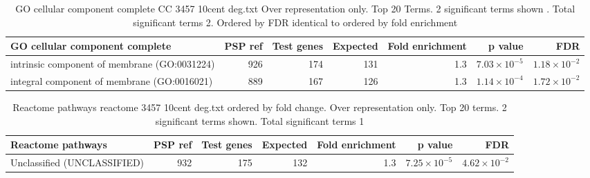 \begin{table}[ht]
\centering
\begin{adjustbox}{width=\textwidth}
\begin{tabular}{lrrrrrr}
  \hline
GO cellular component complete & PSP ref & Test genes & Expected & Fold enrichment & p value & FDR \\ 
  \hline
intrinsic component of membrane (GO:0031224) & 926 & 174 & 131 & 1.3 & $7.03 \times 10^{-5}$ & $1.18 \times 10^{-2}$ \\ 
  integral component of membrane (GO:0016021) & 889 & 167 & 126 & 1.3 & $1.14 \times 10^{-4}$ & $1.72 \times 10^{-2}$ \\ 
   \hline
\end{tabular}
\end{adjustbox}
\caption{GO cellular component complete CC 3457 10cent deg.txt Over representation only. Top 20 Terms. 2 significant terms shown . Total significant terms 2. Ordered by FDR identical to ordered by fold enrichment} 
\label{tab:GO cellular component complete CC 3457 10cent deg.txt Over representation only. Top 20 Terms. 2 significant terms shown . Total significant terms 2}
\end{table}

\begin{table}[ht]
\centering
\begin{tabular}{lrrrrrr}
  \hline
Reactome pathways & PSP ref & Test genes & Expected & Fold enrichment & p value & FDR \\ 
  \hline
Unclassified (UNCLASSIFIED) & 932 & 175 & 132 & 1.3 & $7.25 \times 10^{-5}$ & $4.62 \times 10^{-2}$ \\ 
   \hline
\end{tabular}
\caption{Reactome pathways reactome 3457 10cent deg.txt ordered by fold change. Over representation only. Top 20 terms. 2 significant terms shown. Total significant terms 1} 
\label{tab:Reactome pathways reactome 3457 10cent deg.txt ordered by fold change. Over representation only. Top 20 terms. 2 significant terms shown. Total significant terms 1}
\end{table}
%
%
%


